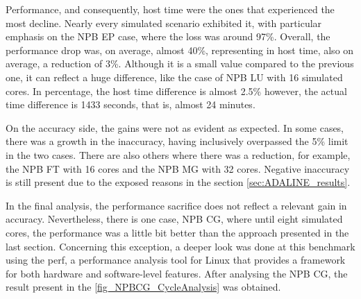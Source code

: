 Performance, and consequently, host time were the ones that experienced the most decline. Nearly every simulated scenario exhibited it, 
with particular emphasis on the NPB EP case, where the loss was around 97\%. Overall, the performance drop was, on average, almost 40\%, 
representing in host time, also on average, a reduction of 3\%. Although it is a small value compared to the previous one, it can reflect a huge 
difference, like the case of NPB LU with 16 simulated cores. In percentage, the host time difference is almost 2.5\% however, 
the actual time difference is 1433 seconds, that is, almost 24 minutes. 

On the accuracy side, the gains were not as evident as expected. In some cases, there was a growth in the inaccuracy, having inclusively overpassed
the 5\% limit in the two cases. There are also others where there was a reduction, for example, the NPB FT with 16 cores and the NPB MG with 32 
cores. Negative inaccuracy is still present due to the exposed reasons in the section \ref{sec:ADALINE_results}. 

In the final analysis, the performance sacrifice does not reflect a relevant gain in accuracy. Nevertheless, there is one case, NPB CG, where until 
eight simulated cores, the performance was a little bit better than the approach presented in the last section. Concerning this exception, a deeper look 
was done at this benchmark using the perf, a performance analysis tool for Linux that provides a framework for both hardware and software-level 
features. After analysing the NPB CG, the result present in the \autoref{fig_NPBCG_CycleAnalysis} was obtained. 

